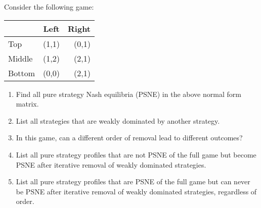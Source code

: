 \documentclass[../main.tex]{subfiles}
\begin{document}
\begin{question}
    Consider the following game:

    \begin{center}
	    \begin{tabular}{|l|c|r|}
	    \hline
	    & Left & Right \\
	    \hline
	    Top & (1,1) & (0,1) \\
	    \hline
	    Middle & (1,2) & (2,1) \\
	    \hline
	    Bottom & (0,0) & (2,1) \\
	    \hline
	    \end{tabular}
    \end{center}

    \begin{enumerate}
    	\item Find all pure strategy Nash equilibria (PSNE) in the above normal form matrix.
    	\item List all strategies that are weakly dominated by another strategy.
    	\item In this game, can a different order of removal lead to different outcomes?
    	\item List all pure strategy profiles that are not PSNE of the full game but become PSNE after iterative removal of weakly dominated strategies.
    	\item List all pure strategy profiles that are PSNE of the full game but can never be PSNE after iterative removal of weakly dominated strategies, regardless of order.
    \end{enumerate}

\end{question}
\end{document}
